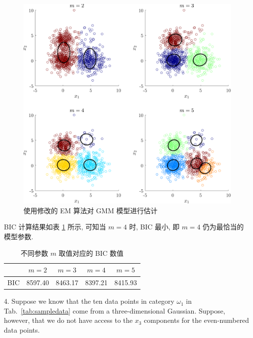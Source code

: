 \documentclass[openany]{ctexbook}
\theoremstyle{kaiti}
\theoremstyle{normal}
\begin{document}
\begin{figure}[htbp]
  \centering
  \includegraphics[width=6in]{gmmem-eqcov.pdf}
  \caption{使用修改的 EM 算法对 GMM 模型进行估计}
  \label{fig:gmmemeq}
\end{figure}

BIC 计算结果如表 \ref{tab:biceq} 所示, 可知当 $m=4$ 时, BIC 最小, 即 $m=4$ 仍为最恰当的模型参数. 

\begin{table}[htbp]
  \centering
  \caption{不同参数 $m$ 取值对应的 BIC 数值}
  \label{tab:biceq}
  \begin{tabular}{ccccc}
    \hline
        & $m=2$ & $m=3$ & $m=4$ & $m=5$ \\
    \hline
    BIC & 8597.40 & 8463.17 & 8397.21 & 8415.93\\
    \hline
  \end{tabular}
\end{table}

4. Suppose we know that the ten data points in category $\omega_1$ in Tab.~\ref{tab:sampledata} come from a three-dimensional Gaussian. Suppose, however, that we do not have access to the $x_3$ components for the even-numbered data points.
\end{document}
